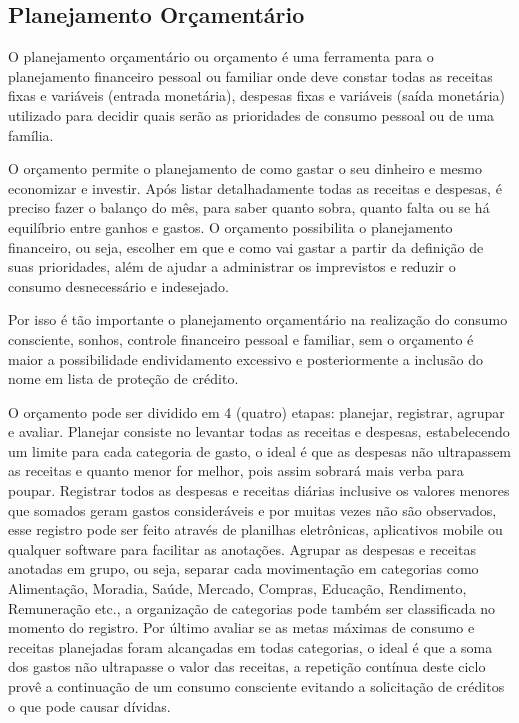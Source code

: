 \subsection{Planejamento Orçamentário}
O planejamento orçamentário ou orçamento é uma ferramenta para o planejamento financeiro pessoal ou familiar onde deve constar todas as receitas fixas e variáveis (entrada monetária), despesas fixas e variáveis (saída monetária) utilizado para decidir quais serão as prioridades de consumo pessoal ou de uma família.

\begin{citacao}
O orçamento permite o planejamento de como gastar o seu dinheiro e mesmo economizar e investir. Após listar detalhadamente todas as receitas e despesas, é preciso fazer o balanço do mês, para saber quanto sobra, quanto falta ou se há equilíbrio entre ganhos e gastos. O orçamento possibilita o planejamento financeiro, ou seja, escolher em que e como vai gastar a partir da definição de suas prioridades, além de ajudar a administrar os imprevistos e reduzir o consumo desnecessário e indesejado. \cite{buaes2015}
\end{citacao} 

Por isso é tão importante o planejamento orçamentário na realização do consumo consciente, sonhos, controle financeiro pessoal e familiar, sem o orçamento é maior a possibilidade endividamento excessivo e posteriormente a inclusão do nome em lista de proteção de crédito.

O orçamento pode ser dividido em 4 (quatro) etapas: planejar, registrar, agrupar e avaliar. Planejar consiste no levantar todas as receitas e despesas, estabelecendo um limite para cada categoria de gasto, o ideal é que as despesas não ultrapassem as receitas e quanto menor for melhor, pois assim sobrará mais verba para poupar. Registrar todos as despesas e receitas diárias inclusive os valores menores que somados geram gastos consideráveis e por muitas vezes não são observados, esse registro pode ser feito através de planilhas eletrônicas, aplicativos mobile ou qualquer software para facilitar as anotações. Agrupar as despesas e receitas anotadas em grupo, ou seja, separar cada movimentação em categorias como Alimentação, Moradia, Saúde, Mercado, Compras, Educação, Rendimento, Remuneração etc., a organização de categorias pode também ser classificada no momento do registro. Por último avaliar se as metas máximas de consumo e receitas planejadas foram alcançadas em todas categorias, o ideal é que a soma dos gastos não ultrapasse o valor das receitas, a repetição contínua deste ciclo provê a continuação de um consumo consciente evitando a solicitação de créditos o que pode causar dívidas.

